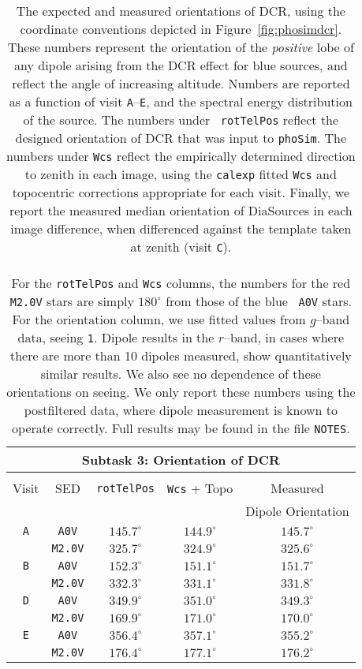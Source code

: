 \documentclass[prd, nofootinbib, floatfix, 11pt, tightenlines, times]{article}
\def\A{{\tt A}}
\def\B{{\tt B}}
\def\C{{\tt C}}
\def\D{{\tt D}}
\def\E{{\tt E}}
\begin{document}
\begin{table}
\centering
\begin{tabular}{ccccc}
\hline
\multicolumn{5}{|c|}{Subtask 3: Orientation of DCR} \\ \hline \\
Visit    & SED & {\tt rotTelPos} & {\tt Wcs} + Topo & Measured \\
         &     &                 &                  & Dipole Orientation \\
\hline
\A & {\tt A0V}   & $145.7^{\circ}$ & $144.9^{\circ}$ & $145.7^{\circ}$    \\
   & {\tt M2.0V} & $325.7^{\circ}$ & $324.9^{\circ}$ & $325.6^{\circ}$    \\
\hline
\B & {\tt A0V}   & $152.3^{\circ}$ & $151.1^{\circ}$ & $151.7^{\circ}$    \\
   & {\tt M2.0V} & $332.3^{\circ}$ & $331.1^{\circ}$ & $331.8^{\circ}$    \\
\hline
\D & {\tt A0V}   & $349.9^{\circ}$ & $351.0^{\circ}$ & $349.3^{\circ}$    \\
   & {\tt M2.0V} & $169.9^{\circ}$ & $171.0^{\circ}$ & $170.0^{\circ}$    \\
\hline
\E & {\tt A0V}   & $356.4^{\circ}$ & $357.1^{\circ}$ & $355.2^{\circ}$    \\
   & {\tt M2.0V} & $176.4^{\circ}$ & $177.1^{\circ}$ & $176.2^{\circ}$    \\
\end{tabular}
\caption[So I can have 2 paragraphs]{The expected and measured
  orientations of DCR, using the coordinate conventions depicted in
  Figure~\ref{fig:phosimdcr}.  These numbers represent the orientation
  of the {\it positive} lobe of any dipole arising from the DCR effect
  for blue sources, and reflect the angle of increasing altitude.
  Numbers are reported as a function of visit \A--\E, and the spectral
  energy distribution of the source.  The numbers under {\tt
    rotTelPos} reflect the designed orientation of DCR that was input
  to {\tt phoSim}.  The numbers under {\tt Wcs} reflect the
  empirically determined direction to zenith in each image, using the
  {\tt calexp} fitted {\tt Wcs} and topocentric corrections
  appropriate for each visit.  Finally, we report the measured median
  orientation of DiaSources in each image difference, when differenced
  against the template taken at zenith (visit \C). \\ ~ \\ For the
  {\tt rotTelPos} and {\tt Wcs} columns, the numbers for the red {\tt
    M2.0V} stars are simply $180^{\circ}$ from those of the blue {\tt
    A0V} stars.  For the orientation column, we use fitted values from
  $g$--band data, seeing {\tt 1}.  Dipole results in the $r$--band, in
  cases where there are more than 10 dipoles measured, show
  quantitatively similar results.  We also see no dependence of these
  orientations on seeing.  We only report these numbers using the
  postfiltered data, where dipole measurement is known to operate
  correctly.  Full results may be found in the file {\tt NOTES}.}
\label{tab:dcrang}
\end{table}
\end{document}

